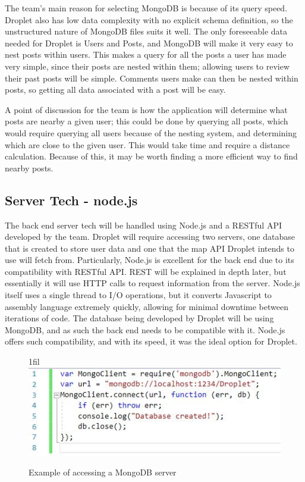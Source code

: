 \documentclass[draftclsnofoot, onecolumn, letterpaper,10pt,compsoc]{IEEEtran}
\makeatletter
\newcommand*{\centerfloat}{%
  \parindent \z@
  \leftskip \z@ \@plus 1fil \@minus \textwidth
  \rightskip\leftskip
  \parfillskip \z@skip}
\newcommand*{\centerfloat}{%
  \parindent \z@
  \leftskip \z@ \@plus 1fil \@minus \textwidth
  \rightskip\leftskip
  \parfillskip \z@skip}
\makeatother
\begin{document}
The team's main reason for selecting MongoDB is because of its query speed. Droplet also has low data complexity with no explicit schema definition, so the unstructured nature of MongoDB files suits it well. The only foreseeable data needed for Droplet is Users and Posts, and MongoDB will make it very easy to nest posts within users. This makes a query for all the posts a user has made very simple, since their posts are nested within them; allowing users to review their past posts will be simple. Comments users make can then be nested within posts, so getting all data associated with a post will be easy. 

A point of discussion for the team is how the application will determine what posts are nearby a given user; this could be done by querying all posts, which would require querying all users because of the nesting system, and determining which are close to the given user. This would take time and require a distance calculation. Because of this, it may be worth finding a more efficient way to find nearby posts. 

\subsection{Server Tech - node.js}
The back end server tech will be handled using Node.js and a RESTful API developed by the team.  Droplet will require accessing two servers, one database that is created to store user data and one that the map API Droplet intends to use will fetch from.  Particularly, Node.js is excellent for the back end due to its compatibility with RESTful API.  REST will be explained in depth later, but essentially it will use HTTP calls to request information from the server.  Node.js itself uses a single thread to I/O operations, but it converts Javascript to assembly language extremely quickly, allowing for minimal downtime between iterations of code.  The database being developed by Droplet will be using MongoDB, and as such the back end needs to be compatible with it.  Node.js offers such compatibility, and with its speed, it was the ideal option for Droplet.
\begin{figure}[H]
    \centerfloat
    \includegraphics[scale=.8]{images/nodejs.JPG}
    \caption{Example of accessing a MongoDB server}
    \label{fig:my_label}
\end{figure}
\end{document}

